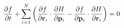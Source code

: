 \documentclass[preview]{standalone}
\begin{document}
\begin{align*}
\special{dvisvgm:raw <g id='unique000'>}\pdv{f}{t}+\sum_{i=1}^{N}\left(\pdv{f}{\va r_i}\cdot\pdv{H}{\va p_i}-\pdv{f}{\va p_i}\cdot\pdv{H}{\va r_i}\right)=0\special{dvisvgm:raw </g>}
\end{align*}
\end{document}
